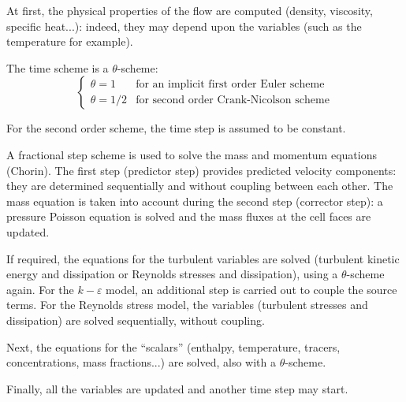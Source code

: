 At first, the physical properties of the flow are computed (density,
viscosity, specific heat...): indeed, they may depend upon the variables
(such as the temperature for example).

The time scheme is a $\theta$-scheme:
\begin{equation}
\left\{%
\begin{array}{ll}
\theta = 1 & \text{for an implicit first order Euler scheme} \\
\theta = 1/2 & \text{for second order Crank-Nicolson scheme}%
\end{array}
\right.
\end{equation}

For the second order scheme, the time step is assumed to be constant.

A fractional step scheme is used to solve the mass and momentum equations
(Chorin). The first step (predictor step) provides predicted velocity
components: they are determined sequentially and without coupling between
each other. The mass equation is taken into account during the second step
(corrector step): a pressure Poisson equation is solved and the mass fluxes
at the cell faces are updated.

If required, the equations for the turbulent variables are solved (turbulent
kinetic energy and dissipation or Reynolds stresses and dissipation), using
a $\theta$-scheme again. For the $k-\varepsilon$ model, an additional step
is carried out to couple the source terms. For the Reynolds stress model,
the variables (turbulent stresses and dissipation) are solved sequentially,
without coupling.

Next, the equations for the ``scalars'' (enthalpy, temperature, tracers,
concentrations, mass fractions...) are solved, also with a $\theta$-scheme.

Finally, all the variables are updated and another time step may start.

